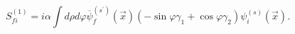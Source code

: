 \begin{equation}
S_{fi}^{\left( 1\right) }=i\alpha \int d\rho d\varphi
\overline{\psi}_{f}^{\left( s^{\prime }\right) }(\vec{x})\left( -\sin \varphi \gamma
_{1}+\cos \varphi \gamma _{2}\right) \psi_{i}^{\left( s\right) }(\vec{x}).
\label{eq24}
\end{equation}

